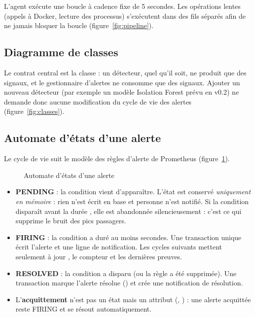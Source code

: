 L'agent exécute une boucle à cadence fixe de 5 secondes. Les opérations lentes (appels à
Docker, lecture des processus) s'exécutent dans des fils séparés afin de ne jamais bloquer la
boucle (figure~\ref{fig:pipeline}).


\subsection{Diagramme de classes}

Le contrat central est la classe  : un détecteur, quel qu'il soit, ne produit que
des signaux, et le gestionnaire d'alertes ne consomme que des signaux. Ajouter un nouveau
détecteur (par exemple un modèle Isolation Forest prévu en v0.2) ne demande donc aucune
modification du cycle de vie des alertes (figure~\ref{fig:classes}).


\subsection{Automate d'états d'une alerte}

Le cycle de vie suit le modèle des règles d'alerte de Prometheus \cite{prometheus-rules}
(figure~\ref{fig:etats}).

\begin{figure}[htbp]
\centering
\resizebox{\linewidth}{!}{}
\caption{Automate d'états d'une alerte}
\label{fig:etats}
\end{figure}

\begin{itemize}
  \item \textbf{PENDING} : la condition vient d'apparaître. L'état est conservé
        \emph{uniquement en mémoire} : rien n'est écrit en base et personne n'est notifié. Si
        la condition disparaît avant la durée , elle est abandonnée silencieusement :
        c'est ce qui supprime le bruit des pics passagers.
  \item \textbf{FIRING} : la condition a duré au moins  secondes. Une transaction
        unique écrit l'alerte et une ligne de notification. Les cycles suivants mettent
        seulement à jour , le compteur et les dernières preuves.
  \item \textbf{RESOLVED} : la condition a disparu (ou la règle a été supprimée). Une
        transaction marque l'alerte résolue () et crée une
        notification de résolution.
  \item L'\textbf{acquittement} n'est pas un état mais un attribut (,
        ) : une alerte acquittée reste FIRING et se résout automatiquement.
\end{itemize}

